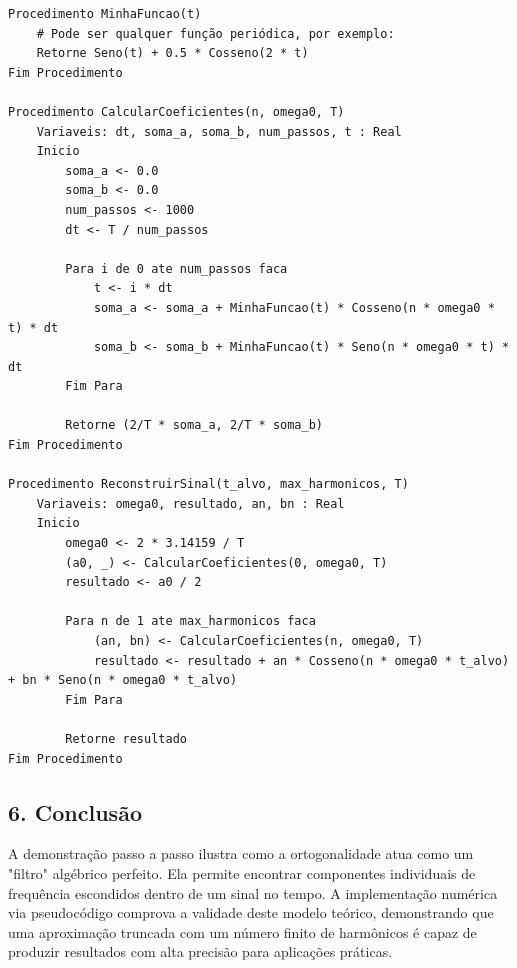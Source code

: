 \begin{lstlisting}[language={}, caption={Algoritmo de Analise e Sintese de Fourier}]
Procedimento MinhaFuncao(t)
    # Pode ser qualquer função periódica, por exemplo:
    Retorne Seno(t) + 0.5 * Cosseno(2 * t)
Fim Procedimento

Procedimento CalcularCoeficientes(n, omega0, T)
    Variaveis: dt, soma_a, soma_b, num_passos, t : Real
    Inicio
        soma_a <- 0.0
        soma_b <- 0.0
        num_passos <- 1000
        dt <- T / num_passos
        
        Para i de 0 ate num_passos faca
            t <- i * dt
            soma_a <- soma_a + MinhaFuncao(t) * Cosseno(n * omega0 * t) * dt
            soma_b <- soma_b + MinhaFuncao(t) * Seno(n * omega0 * t) * dt
        Fim Para
        
        Retorne (2/T * soma_a, 2/T * soma_b)
Fim Procedimento

Procedimento ReconstruirSinal(t_alvo, max_harmonicos, T)
    Variaveis: omega0, resultado, an, bn : Real
    Inicio
        omega0 <- 2 * 3.14159 / T
        (a0, _) <- CalcularCoeficientes(0, omega0, T)
        resultado <- a0 / 2
        
        Para n de 1 ate max_harmonicos faca
            (an, bn) <- CalcularCoeficientes(n, omega0, T)
            resultado <- resultado + an * Cosseno(n * omega0 * t_alvo) + bn * Seno(n * omega0 * t_alvo)
        Fim Para
        
        Retorne resultado
Fim Procedimento
\end{lstlisting}

\subsection*{6. Conclusão}
A demonstração passo a passo ilustra como a ortogonalidade atua como um "filtro" algébrico perfeito. Ela permite encontrar componentes individuais de frequência escondidos dentro de um sinal no tempo. A implementação numérica via pseudocódigo comprova a validade deste modelo teórico, demonstrando que uma aproximação truncada com um número finito de harmônicos é capaz de produzir resultados com alta precisão para aplicações práticas.